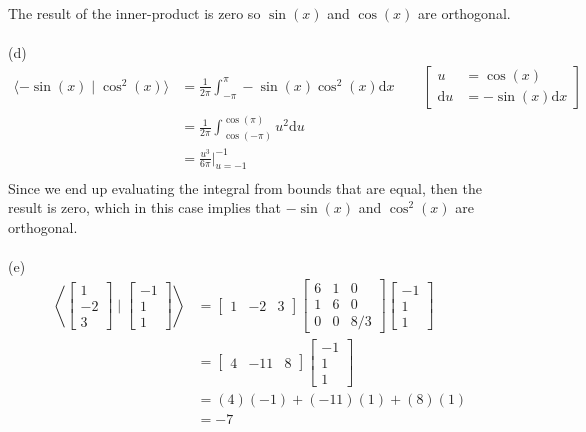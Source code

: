 \documentclass{report}
\begin{document}
The result of the inner-product is zero so $\sin(x)$ and $\cos(x)$ are orthogonal. \\
\\
\noindent(d)
$$
\begin{aligned}
\langle -\sin(x) \mid \cos^2(x) \rangle &= \frac{1}{2\pi}\int_{-\pi}^\pi -\sin(x)\cos^2(x)\mathrm{d}x\qquad
\left[
\begin{aligned}
u &= \cos(x)\\
\mathrm{d}u &= -\sin(x)\mathrm{d}x
\end{aligned}
\right] \\
&= \frac{1}{2\pi}\int_{\cos(-\pi)}^{\cos(\pi)}u^2\mathrm{d}u\\
&=\frac{u^3}{6\pi}\biggr\rvert_{u=-1}^{-1}\\
\end{aligned}
$$
Since we end up evaluating the integral from bounds that are equal,  then the result is zero,  which in this case implies that $-\sin(x)$ and $\cos^2(x)$ are orthogonal.\\
\\
\noindent (e)
$$
\begin{aligned}
\left\langle
\begin{bmatrix}1\\-2\\3\end{bmatrix}
\mid
\begin{bmatrix}-1\\1\\1\end{bmatrix}
\right\rangle &=
\begin{bmatrix}1&-2&3\end{bmatrix}\begin{bmatrix}
6 & 1 & 0 \\
1 & 6 & 0 \\
0 & 0 & 8 / 3
\end{bmatrix}\begin{bmatrix}-1\\1\\1\end{bmatrix} \\
& =\begin{bmatrix}4&-11&8\end{bmatrix}\begin{bmatrix}-1\\1\\1\end{bmatrix}\\
&=(4)(-1)+(-11)(1)+(8)(1)\\
&=-7
\end{aligned}
$$
\end{document}
